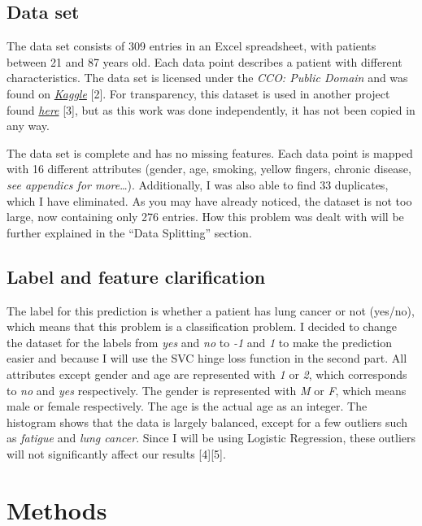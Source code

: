 \documentclass[a4paper,12pt]{article}
\begin{document}
\subsection{Data set}
\label{sec:org4eed7b1}
The data set consists of 309 entries in an Excel spreadsheet, with patients between 21 and 87 years old.
Each data point describes a patient with different characteristics.
The data set is licensed under the \emph{CCO: Public Domain} and was found on \emph{\href{https://www.kaggle.com/datasets/mysarahmadbhat/lung-cancer}{Kaggle}} [2].
For transparency, this dataset is used in another project found \emph{\href{https://www.kaggle.com/code/gaganmaahi224/lung-cancer-5ml-models-full-analysis-plotly}{here}} [3], but as this work was done independently, it has not been copied in any way.

The data set is complete and has no missing features. Each data point is mapped with 16 different attributes (gender, age, smoking, yellow fingers, chronic disease, \emph{see appendics for more}\ldots{}).
Additionally, I was also able to find 33 duplicates, which I have eliminated.
As you may have already noticed, the dataset is not too large, now containing only 276 entries. How this problem was dealt with will be further explained in the ``Data Splitting'' section.

\subsection{Label and feature clarification}
\label{sec:orga61c99e}
The label for this prediction is whether a patient has lung cancer or not (yes/no), which means that this problem is a classification problem.
I decided to change the dataset for the labels from \emph{yes} and \emph{no} to \emph{-1} and \emph{1} to make the prediction easier and because I will use the SVC hinge loss function in the second part.
All attributes except gender and age are represented with \emph{1} or \emph{2}, which corresponds to \emph{no} and \emph{yes} respectively. The gender is represented with \emph{M} or \emph{F}, which means male or female respectively. The age is the actual age as an integer.
The histogram shows that the data is largely balanced, except for a few outliers such as \emph{fatigue} and \emph{lung cancer}. Since I will be using Logistic Regression, these outliers will not significantly affect our results [4][5].

\section{Methods}
\label{sec:org9e5ceb1}
\end{document}
